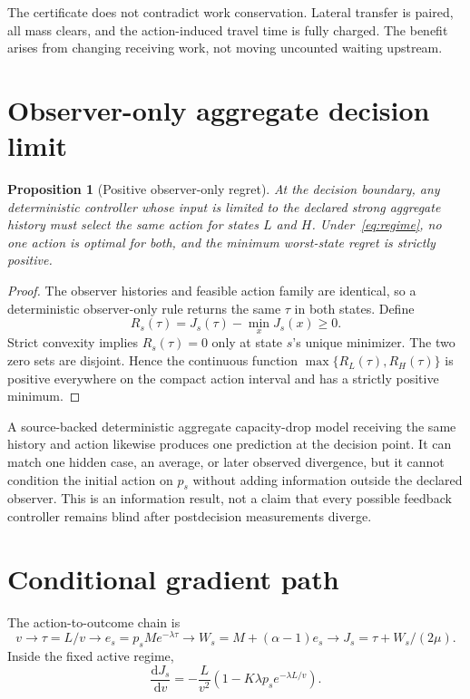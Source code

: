 \documentclass[11pt]{article}
\newtheorem{proposition}{Proposition}
\newcommand{\dd}{\mathrm{d}}
\begin{document}
The certificate does not contradict work conservation. Lateral transfer is
paired, all mass clears, and the action-induced travel time is fully charged.
The benefit arises from changing receiving work, not moving uncounted waiting
upstream.

\section{Observer-only aggregate decision limit}

\begin{proposition}[Positive observer-only regret]
At the decision boundary, any deterministic controller whose input is limited to
the declared strong aggregate history must select the same action for states
\(L\) and \(H\). Under~\eqref{eq:regime}, no one action is optimal for both, and
the minimum worst-state regret is strictly positive.
\end{proposition}

\begin{proof}
The observer histories and feasible action family are identical, so a
deterministic observer-only rule returns the same \(\tau\) in both states. Define
\[
 R_s(\tau)=J_s(\tau)-\min_x J_s(x)\ge0.
\]
Strict convexity implies \(R_s(\tau)=0\) only at state \(s\)'s unique minimizer.
The two zero sets are disjoint. Hence the continuous function
\(\max\{R_L(\tau),R_H(\tau)\}\) is positive everywhere on the compact action
interval and has a strictly positive minimum.
\end{proof}

A source-backed deterministic aggregate capacity-drop model receiving the same
history and action likewise produces one prediction at the decision point. It
can match one hidden case, an average, or later observed divergence, but it
cannot condition the initial action on \(p_s\) without adding information outside
the declared observer. This is an information result, not a claim that every
possible feedback controller remains blind after postdecision measurements
diverge.

\section{Conditional gradient path}

The action-to-outcome chain is
\[
 v\longrightarrow \tau=L/v
 \longrightarrow e_s=p_sM e^{-\lambda\tau}
 \longrightarrow W_s=M+(\alpha-1)e_s
 \longrightarrow J_s=\tau+W_s/(2\mu).
\]
Inside the fixed active regime,
\begin{equation}
 \frac{\dd J_s}{\dd v}
 =-\frac{L}{v^2}\left(1-K\lambda p_s e^{-\lambda L/v}\right).
 \label{eq:gradient}
\end{equation}
\end{document}

